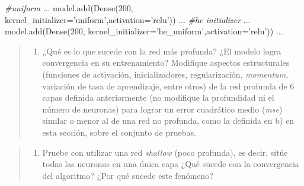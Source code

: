 \documentclass[11pt]{article}
\providecommand{\tightlist}{%
      \setlength{\itemsep}{0pt}\setlength{\parskip}{0pt}}
\newenvironment{Shaded}{}{}
\newcommand{\DecValTok}[1]{\textcolor[rgb]{0.25,0.63,0.44}{{#1}}}
\newcommand{\StringTok}[1]{\textcolor[rgb]{0.25,0.44,0.63}{{#1}}}
\newcommand{\CommentTok}[1]{\textcolor[rgb]{0.38,0.63,0.69}{\textit{{#1}}}}
\newcommand{\NormalTok}[1]{{#1}}
\newcommand{\OperatorTok}[1]{\textcolor[rgb]{0.40,0.40,0.40}{{#1}}}
\begin{document}
\begin{Shaded}
\begin{Highlighting}[]
\CommentTok{#uniform}
\NormalTok{...}
\NormalTok{model.add(Dense(}\DecValTok{200}\NormalTok{, kernel_initializer}\OperatorTok{=}\StringTok{'uniform'}\NormalTok{,activation}\OperatorTok{=}\StringTok{'relu'}\NormalTok{))}
\NormalTok{...}
\CommentTok{#he initializer}
\NormalTok{...}
\NormalTok{model.add(Dense(}\DecValTok{200}\NormalTok{, kernel_initializer}\OperatorTok{=}\StringTok{'he_uniform'}\NormalTok{,activation}\OperatorTok{=}\StringTok{'relu'}\NormalTok{))}
\NormalTok{...}
\end{Highlighting}
\end{Shaded}

\begin{quote}
\begin{enumerate}
\def\labelenumi{\alph{enumi})}
\setcounter{enumi}{4}
\tightlist
\item
  ¿Qué es lo que sucede con la red más profunda? ¿El modelo logra
  convergencia en su entrenamiento? Modifique aspectos estructurales
  (funciones de activación, inicializadores, regularización,
  \emph{momentum}, variación de tasa de aprendizaje, entre otros) de la
  red profunda de 6 capas definida anteriormente (no modifique la
  profundidad ni el número de neuronas) para lograr un error cuadrático
  medio (\emph{mse}) similar o menor al de una red no profunda, como la
  definida en b) en esta sección, sobre el conjunto de pruebas.
\end{enumerate}
\end{quote}

\begin{quote}
\begin{enumerate}
\def\labelenumi{\alph{enumi})}
\setcounter{enumi}{5}
\tightlist
\item
  Pruebe con utilizar una red \emph{shallow} (poco profunda), es decir,
  sitúe todas las neuronas en una única capa ¿Qué sucede con la
  convergencia del algoritmo? ¿Por qué sucede este fenómeno?
\end{enumerate}
\end{quote}
\end{document}
